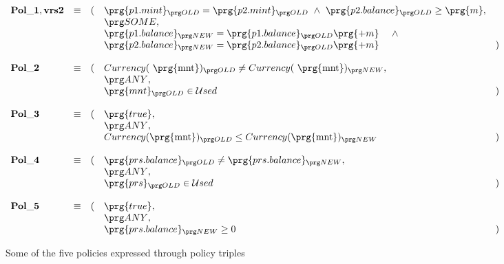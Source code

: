  
\begin{figure}
$\begin{array}{lclll}
{\bf Pol\_1, vrs2} & \equiv & ( & 
 \prg{p1.mint}\old=\prg{p2.mint}\old\   \wedge   
    \ \prg{p2.balance} \old\geq \prg{m}, \\
& & &  \some , \\
 & & &
  \prg{p1.balance}\new=\prg{p1.balance}\old\prg{+m}\  \ \ \  \wedge  \\
     & & &   \prg{p2.balance}\new=\prg{p2.balance}\old\prg{+m}  
 &  )
\\
\\
{\bf Pol\_2} & \equiv & ( &Currency( \mbox{ \prg{mnt}})\old\neq Currency( \mbox{ \prg{mnt}})\new,\\
& & & \any , \\
 & & &
\prg{mnt}\old \in {\mathcal U}sed & )  \\
\\
{\bf Pol\_3} & \equiv & ( & \prg{true},\\
& & &  \any , \\
 & & &
 Currency(\mbox{\prg{mnt}})\old\leq  Currency(\mbox{\prg{mnt}})\new   &  )
\\
\\
{\bf Pol\_4} & \equiv & ( & \prg{prs.balance}\old\neq\prg{prs.balance}\new,\\
& & &  \any , \\
 & & &
\prg{prs}\old \in {\mathcal U}sed & )
\\
\\
{\bf Pol\_5} & \equiv & ( & \prg{true},\\
& & &  \any , \\
 & & &
 \prg{prs.balance}\new\geq 0 & )
\end{array}
$
\caption{Some of the five policies expressed through policy triples}
\label{fig:pols}
\end{figure}

  


